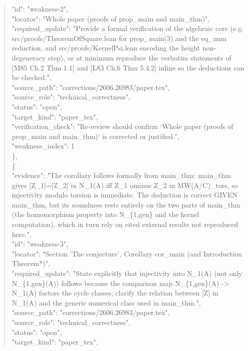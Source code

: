 \documentclass[11pt]{article}
\begin{document}
\begin{quote}
      "id": "weakness-2",\\
      "locator": "Whole paper (proofs of prop\_main and main\_thm)",\\
      "required\_update": "Provide a formal verification of the algebraic core (e.g. src/proofs/TheoremOfSquare.lean for prop\_main(3) and the eq\_num reduction, and src/proofs/KernelPsi.lean encoding the height non-degeneracy step), or at minimum reproduce the verbatim statements of [M85 Ch.2 Thm 1.1] and [L83 Ch.6 Thm 5.4.2] inline so the deductions can be checked.",\\
      "source\_path": "corrections/2606.26983/paper.tex",\\
      "source\_role": "technical\_correctness",\\
      "status": "open",\\
      "target\_kind": "paper\_tex",\\
      "verification\_check": "Re-review should confirm `Whole paper (proofs of prop\_main and main\_thm)` is corrected or justified.",\\
      "weakness\_index": 1\\
    \},\\
    \{\\
      "evidence": "The corollary follows formally from main\_thm: main\_thm gives [Z\_1]=[Z\_2] in N\_1(A) iff Z\_1 ominus Z\_2 in MW(A/C)\_tors, so injectivity modulo torsion is immediate. The deduction is correct GIVEN main\_thm, but its soundness rests entirely on the two parts of main\_thm (the homomorphism property into N\_\{1,gen\} and the kernel computation), which in turn rely on cited external results not reproduced here.",\\
      "id": "weakness-3",\\
      "locator": "Section 'The conjecture', Corollary cor\_main (and Introduction Theorem*)",\\
      "required\_update": "State explicitly that injectivity into N\_1(A) (not only N\_\{1,gen\}(A)) follows because the comparison map N\_\{1,gen\}(A) -> N\_1(A) factors the cycle classes; clarify the relation between [Z] in N\_1(A) and the generic numerical class used in main\_thm.",\\
      "source\_path": "corrections/2606.26983/paper.tex",\\
      "source\_role": "technical\_correctness",\\
      "status": "open",\\
      "target\_kind": "paper\_tex",\\

\end{quote}
\end{document}
